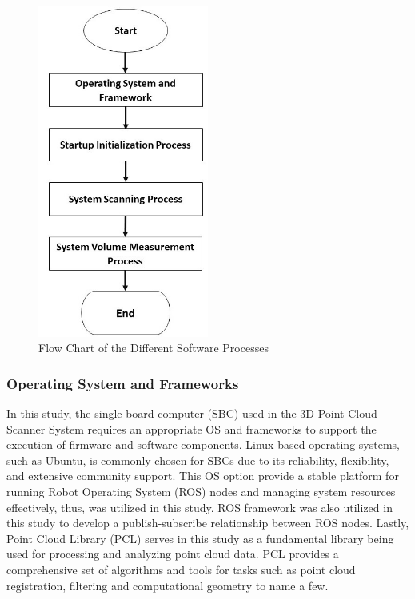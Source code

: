 \begin{figure}[H]
	\centering
	\includegraphics[width=0.5\textwidth, height=0.9\textwidth]{Figures/software-development}
	\caption{Flow Chart of the Different Software Processes}
	\label{ch3:fig:software-development}
\end{figure}

\subsubsection{Operating System and Frameworks}

In this study, the single-board computer (SBC) used in the 3D Point Cloud Scanner System requires an appropriate OS and frameworks to support the execution of firmware and software components. Linux-based operating systems, such as Ubuntu, is commonly chosen for SBCs due to its reliability, flexibility, and extensive community support. This OS option provide a stable platform for running Robot Operating System (ROS) nodes and managing system resources effectively, thus, was utilized in this study. ROS framework was also utilized in this study to develop a publish-subscribe relationship between ROS nodes. Lastly, Point Cloud Library (PCL) serves in this study as a fundamental library being used for processing and analyzing point cloud data. PCL provides a comprehensive set of algorithms and tools for tasks such as point cloud registration, filtering and computational geometry to name a few.

